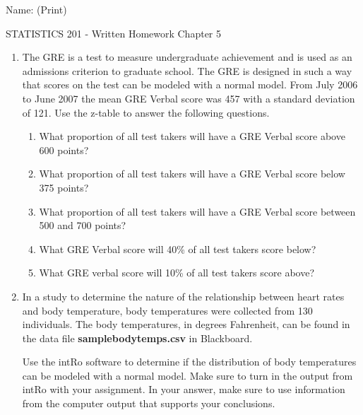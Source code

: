 \documentclass{article}
\begin{document}
\hspace{2in} Name: (Print) \underline{\mbox{\hspace{3.5in}}}\\

\begin{center}
{\large STATISTICS 201 - Written Homework Chapter 5}\\[3mm]
\end{center}

\begin{enumerate}

\item The GRE is a test to measure undergraduate achievement and is used as an admissions criterion to graduate school. The GRE is designed in such a way that scores on the test can be modeled with a normal model. From July 2006 to June 2007 the mean GRE Verbal score was 457 with a standard deviation of 121. Use the z-table to answer the following questions. 

\begin{enumerate}
\item What proportion of all test takers will have a GRE Verbal score above 600 points?\\%
\item What proportion of all test takers will have a GRE Verbal score below 375 points?\\%
\item What proportion of all test takers will have a GRE Verbal score between 500 and 700 points?\\%
\item What GRE Verbal score will 40\% of all test takers score below?\\%
\item What GRE verbal score will 10\% of all test takers score above?
\end{enumerate}


\item In a study to determine the nature of the relationship between heart rates and body temperature, body temperatures were collected from 130 individuals. The body temperatures, in degrees Fahrenheit, can be found in the  data file {\bf samplebodytemps.csv} in Blackboard.

Use the intRo software to determine if the distribution of body temperatures can be modeled with a normal model. Make sure to turn in the output from intRo with your assignment. In your answer, make sure to use information from the computer output that supports your conclusions. 

\end{enumerate}
\end{document}
